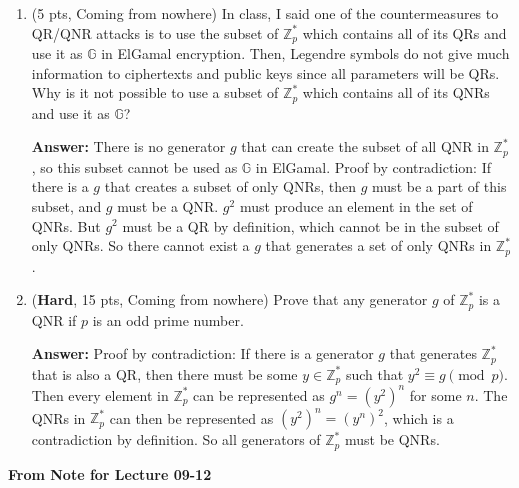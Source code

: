 \documentclass[10pt]{article}
\begin{document}
\begin{enumerate}
	\bigskip\item (5 pts, Coming from nowhere) In class, I said one of the countermeasures to QR/QNR attacks is to use the subset of $\mathbb{Z}_p^*$ which contains all of its QRs and use it as $\mathbb{G}$ in ElGamal encryption. Then, Legendre symbols do not give much information to ciphertexts and public keys since all parameters will be QRs. Why is it not possible to use a subset of $\mathbb{Z}_p^*$ which contains all of its QNRs and use it as $\mathbb{G}$?
	
	\textbf{Answer:} \newline There is no generator $g$ that can create the subset of all QNR in $\mathbb{Z}_p^*$, so this subset cannot be used as $\mathbb{G}$ in ElGamal. Proof by contradiction: If there is a $g$ that creates a subset of only QNRs, then $g$ must be a part of this subset, and $g$ must be a QNR. $g^2$ must produce an element in the set of QNRs. But $g^2$ must be a QR by definition, which cannot be in the subset of only QNRs. So there cannot exist a $g$ that generates a set of only QNRs in $\mathbb{Z}_p^*$. 
	
	\bigskip\item (\textbf{Hard}, 15 pts, Coming from nowhere) Prove that any generator $g$ of $\mathbb{Z}_p^*$ is a QNR  if $p$ is an odd prime number.
    
    \textbf{Answer:} \newline Proof by contradiction: If there is a generator $g$ that generates $\mathbb{Z}_p^*$ that is also a QR, then there must be some $y\in \mathbb{Z}_p^*$ such that $y^2\equiv g\pmod p$. Then every element in $\mathbb{Z}_p^*$ can be represented as $g^n=(y^2)^n$ for some $n$. The QNRs in $\mathbb{Z}_p^*$ can then be represented as $(y^2)^n=(y^n)^2$, which is a contradiction by definition. So all generators of $\mathbb{Z}_p^*$ must be QNRs. 
	
\end{enumerate}


\textbf{From Note for Lecture 09-12}
\end{document}
